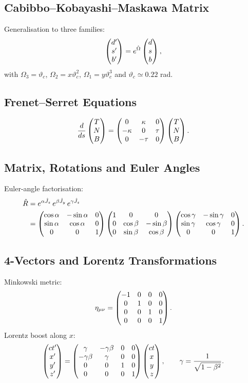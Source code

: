 \subsection{Cabibbo--Kobayashi--Maskawa Matrix}
\label{sec:1.6.3}

Generalisation to three families:
\[
\begin{pmatrix}d'\\s'\\b'\end{pmatrix} = e^{\hat{\Omega}}\begin{pmatrix}d\\s\\b\end{pmatrix},
\]
with $\Omega_{3}=\vartheta_{c}$, $\Omega_{2}=x\vartheta_{c}^{2}$, $\Omega_{1}=y\vartheta_{c}^{3}$
and $\vartheta_{c}\simeq 0.22$ rad.

\subsection{Frenet--Serret Equations}
\label{sec:1.6.4}

\[
\frac{d}{ds}\begin{pmatrix}T\\N\\B\end{pmatrix}
= \begin{pmatrix}0&\kappa&0\\-\kappa&0&\tau\\0&-\tau&0\end{pmatrix}
  \begin{pmatrix}T\\N\\B\end{pmatrix}.
\]

\subsection{Matrix, Rotations and Euler Angles}
\label{sec:1.6.5}

Euler-angle factorisation:
\begin{align*}
\hat{R}
&= e^{\alpha\hat{J}_{z}}\,e^{\beta\hat{J}_{y}}\,e^{\gamma\hat{J}_{z}} \\
&= \begin{pmatrix}\cos\alpha&-\sin\alpha&0\\\sin\alpha&\cos\alpha&0\\0&0&1\end{pmatrix}
   \begin{pmatrix}1&0&0\\0&\cos\beta&-\sin\beta\\0&\sin\beta&\cos\beta\end{pmatrix}
   \begin{pmatrix}\cos\gamma&-\sin\gamma&0\\\sin\gamma&\cos\gamma&0\\0&0&1\end{pmatrix}.
\end{align*}

\subsection{4-Vectors and Lorentz Transformations}
\label{sec:1.6.6}

Minkowski metric:
\[
\eta_{\mu\nu} = \begin{pmatrix}-1&0&0&0\\0&1&0&0\\0&0&1&0\\0&0&0&1\end{pmatrix}.
\]
Lorentz boost along $x$:
\[
\begin{pmatrix}ct'\\x'\\y'\\z'\end{pmatrix}
= \begin{pmatrix}\gamma&-\gamma\beta&0&0\\-\gamma\beta&\gamma&0&0\\0&0&1&0\\0&0&0&1\end{pmatrix}
  \begin{pmatrix}ct\\x\\y\\z\end{pmatrix},
\qquad \gamma = \frac{1}{\sqrt{1-\beta^{2}}}.
\]

